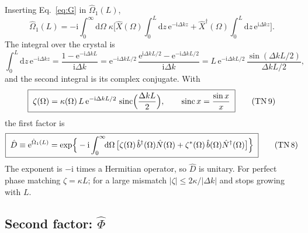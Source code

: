 \documentclass[aps,pra,onecolumn,notitlepage,11pt,amsmath,amssymb,nofootinbib]{revtex4-2}
\newcommand{\Nop}{\hat N}
\newcommand{\Xop}{\hat X}
\newcommand{\dd}{\mathrm{d}}
\newcommand{\ee}{\mathrm{e}}
\newcommand{\ii}{\mathrm{i}}
\newcommand{\sinc}{\operatorname{sinc}}
\newcommand{\TN}[1]{\text{TN\,#1}}
\begin{document}
Inserting Eq.~\eqref{eq:G} in $\hat\Omega_1(L)$,
\begin{equation}
\hat\Omega_1(L)=-\ii\int_0^\infty\!\!\dd\Omega\;\kappa
\Big[\Xop(\Omega)\int_0^L\!\!\dd z\,\ee^{-\ii\Delta kz}
+\Xop^\dagger(\Omega)\int_0^L\!\!\dd z\,\ee^{\ii\Delta kz}\Big].
\end{equation}
The integral over the crystal is
\begin{equation}
\int_0^L\!\!\dd z\,\ee^{-\ii\Delta kz}=\frac{1-\ee^{-\ii\Delta kL}}{\ii\Delta k}
=\ee^{-\ii\Delta kL/2}\,\frac{\ee^{\ii\Delta kL/2}-\ee^{-\ii\Delta kL/2}}{\ii\Delta k}
=L\,\ee^{-\ii\Delta kL/2}\,\frac{\sin(\Delta kL/2)}{\Delta kL/2},
\end{equation}
and the second integral is its complex conjugate. With
\begin{equation}
\boxed{\;\zeta(\Omega)=\kappa(\Omega)\,L\,\ee^{-\ii\Delta kL/2}\,
\sinc\!\Big(\frac{\Delta kL}{2}\Big),\qquad\sinc x=\frac{\sin x}{x}\;}
\tag{\TN{9}}
\end{equation}
the first factor is
\begin{equation}
\boxed{\;\hat D\equiv\ee^{\hat\Omega_1(L)}
=\exp\!\Big\{-\ii\int_0^\infty\!\!\dd\Omega\,
\big[\zeta(\Omega)\,\hat b^\dagger(\Omega)\Nop(\Omega)
+\zeta^*(\Omega)\,\hat b(\Omega)\Nop^\dagger(\Omega)\big]\Big\}\;}
\tag{\TN{8}}
\end{equation}
The exponent is $-\ii$ times a Hermitian operator, so $\hat D$ is unitary.
For perfect phase matching $\zeta=\kappa L$; for a large mismatch
$|\zeta|\le2\kappa/|\Delta k|$ and stops growing with $L$.

\subsection{Second factor: \texorpdfstring{$\hat\Phi$}{Phi}}
\label{sec:second}
\end{document}

